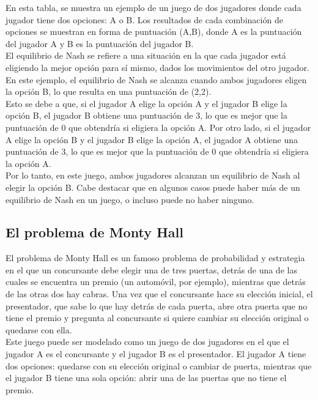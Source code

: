 En esta tabla, se muestra un ejemplo de un juego de dos jugadores donde cada jugador tiene dos opciones: 
A o B. Los resultados de cada combinación de opciones se muestran en forma de puntuación (A,B), 
donde A es la puntuación del jugador A y B es la puntuación del jugador B.\\

El equilibrio de Nash se refiere a una situación en la que cada jugador está eligiendo la mejor opción para sí mismo,
dados los movimientos del otro jugador. En este ejemplo, el equilibrio de Nash se alcanza cuando 
ambos jugadores eligen la opción B, lo que resulta en una puntuación de (2,2).\\

Esto se debe a que, si el jugador A elige la opción A y el jugador B elige la opción B, el jugador
B obtiene una puntuación de 3, lo que es mejor que la puntuación de 0 que obtendría si eligiera 
la opción A. Por otro lado, si el jugador A elige la opción B y el jugador B elige la opción A, 
el jugador A obtiene una puntuación de 3, lo que es mejor que la puntuación de 0 que obtendría 
si eligiera la opción A.\\

Por lo tanto, en este juego, ambos jugadores alcanzan un equilibrio de Nash al elegir la opción B. 
Cabe destacar que en algunos casos puede haber más de un equilibrio de Nash en un juego, o incluso 
puede no haber ninguno.

\subsection{El problema de Monty Hall}

El problema de Monty Hall es un famoso problema de probabilidad y estrategia en el que un concursante 
debe elegir una de tres puertas, detrás de una de las cuales se encuentra un premio 
(un automóvil, por ejemplo), mientras que detrás de las otras dos hay cabras. 
Una vez que el concursante hace su elección inicial, el presentador, que sabe lo que hay detrás 
de cada puerta, abre otra puerta que no tiene el premio y pregunta al concursante si quiere cambiar 
su elección original o quedarse con ella.\\

Este juego puede ser modelado como un juego de dos jugadores en el que el jugador A es el concursante 
y el jugador B es el presentador. El jugador A tiene dos opciones: quedarse con su elección original 
o cambiar de puerta, mientras que el jugador B tiene una sola opción: abrir una de las puertas que 
no tiene el premio.\\

